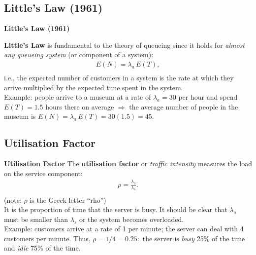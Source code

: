 \documentclass[compress]{beamer}        %
\makeatletter
\newcommand{\tcb}{\textcolor{beamer@blendedblue}}
\makeatother
\begin{document}
\subsection{Little's Law (1961)}
\begin{frame}{\bf \tcb{Little's Law (1961)}}

{\bf Little's Law} is fundamental to the theory of queueing since it holds for \emph{almost any queueing system} (or component of a system):\\
\begin{align*}
\boxed{E(N) = \lambda_a \, E(T)},\\[-0.3cm]
\end{align*}
i.e., the expected number of customers in a system is the rate at which they arrive multiplied by the expected time spent in the system.\\[1cm]

Example: people arrive to a museum at a rate of $\lambda_a = 30$ per hour and spend $E(T) = 1.5$ hours there on average $\Rightarrow$ the average number of people in the museum is $E(N) = \lambda_a \, E(T) = 30(1.5) = 45$.
\end{frame}



\subsection{Utilisation Factor}
\begin{frame}{\bf \tcb{Utilisation Factor}}
The {\bf utilisation factor} or \emph{traffic intensity} measures the load on the service component:\\[-0.4cm]
\begin{align*}
\boxed{\rho = \frac{\lambda_a}{\lambda_s}}.\\[-0.6cm]
\end{align*}
{\footnotesize(note: $\rho$ is the Greek letter ``rho'')}\\[0.3cm]

It is the proportion of time that the server is busy. It should be clear that $\lambda_a$ must be smaller than $\lambda_s$ or the system becomes overloaded.\\[0.6cm]

Example: customers arrive at a rate of 1 per minute; the server can deal with 4 customers per minute. Thus, $\rho = 1/4 = 0.25:$ the server is \emph{busy} 25\% of the time and \emph{idle} 75\% of the time.

\end{frame}
\end{document}
